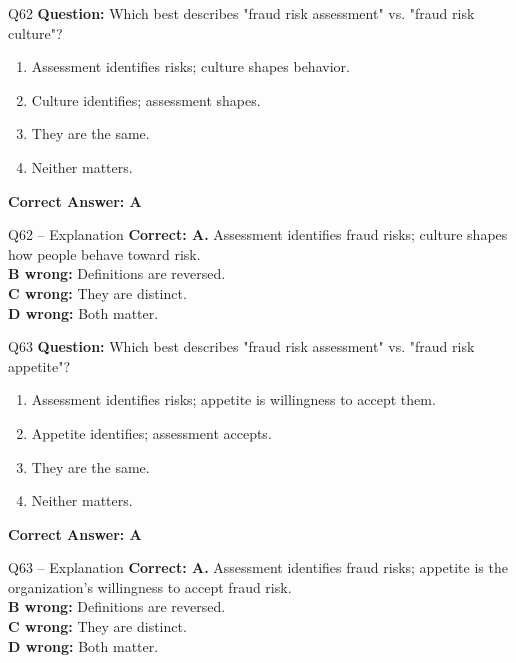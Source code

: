 \documentclass[aspectratio=169,10pt]{beamer}
\begin{document}
	\begin{frame}[t]{Q62}
		\small
		\textbf{Question:} Which best describes "fraud risk assessment" vs. "fraud risk culture"?
		\begin{enumerate}[label=\Alph*.,itemsep=1pt,topsep=2pt]
			\item Assessment identifies risks; culture shapes behavior.
			\item Culture identifies; assessment shapes.
			\item They are the same.
			\item Neither matters.
		\end{enumerate}
		\vspace{4pt}
		\textbf{Correct Answer: A}
	\end{frame}
	
	\begin{frame}[t]{Q62 -- Explanation}
		\small
		\textbf{Correct: A.} Assessment identifies fraud risks; culture shapes how people behave toward risk. \\[4pt]
		\textbf{B wrong:} Definitions are reversed. \\[2pt]
		\textbf{C wrong:} They are distinct. \\[2pt]
		\textbf{D wrong:} Both matter.
	\end{frame}
	
	\begin{frame}[t]{Q63}
		\small
		\textbf{Question:} Which best describes "fraud risk assessment" vs. "fraud risk appetite"?
		\begin{enumerate}[label=\Alph*.,itemsep=1pt,topsep=2pt]
			\item Assessment identifies risks; appetite is willingness to accept them.
			\item Appetite identifies; assessment accepts.
			\item They are the same.
			\item Neither matters.
		\end{enumerate}
		\vspace{4pt}
		\textbf{Correct Answer: A}
	\end{frame}
	
	\begin{frame}[t]{Q63 -- Explanation}
		\small
		\textbf{Correct: A.} Assessment identifies fraud risks; appetite is the organization's willingness to accept fraud risk. \\[4pt]
		\textbf{B wrong:} Definitions are reversed. \\[2pt]
		\textbf{C wrong:} They are distinct. \\[2pt]
		\textbf{D wrong:} Both matter.
	\end{frame}
	
\end{document}
